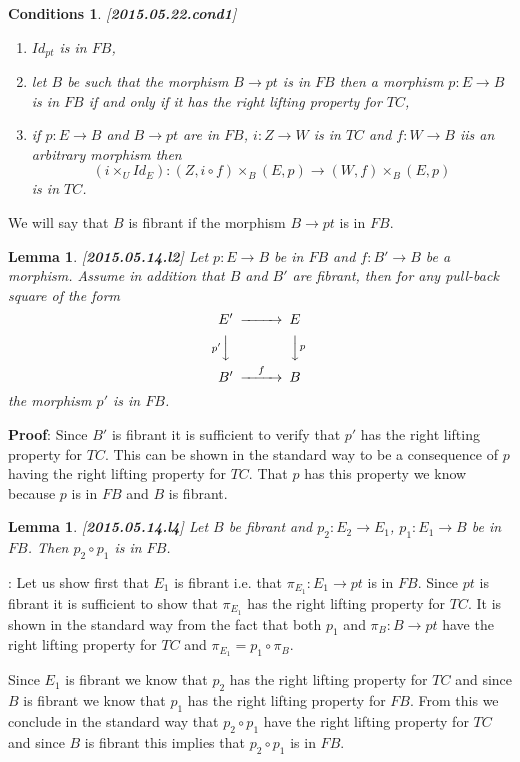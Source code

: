 \documentclass[12pt]{article}
\newenvironment{myproof}{{\bf Proof}:}{\vskip 5mm }
\newtheorem{lemma}[proposition]{Lemma}
\newtheorem{cond}[proposition]{Conditions}
\newcommand{\llabel}[1]{\label{#1}[{\bf #1}]}
\newcommand{\sr}{\rightarrow}
\begin{document}
%
\begin{cond}\llabel{2015.05.22.cond1}
%
\begin{enumerate}
\item $Id_{pt}$ is in $FB$,
\item let $B$ be such that the morphism $B\sr pt$ is in $FB$ then a morphism $p:E\sr B$ is in $FB$ if and only if it has the right lifting property for $TC$,
\item if $p:E\sr B$ and $B\sr pt$ are in $FB$, $i:Z\sr W$ is in $TC$ and $f:W\sr B$ iis an arbitrary morphism then
%
$$(i\times_U Id_E):(Z,i\circ f)\times_B (E,p)\sr (W,f)\times_B (E,p)$$
%
is in $TC$.
%
\end{enumerate}
\end{cond}
%
We will say that $B$ is fibrant if the morphism $B\sr pt$ is in $FB$. 
%
\begin{lemma}
\llabel{2015.05.14.l2}
Let $p:E\sr B$ be in $FB$ and $f:B'\sr B$ be a morphism. Assume in addition that $B$ and $B'$ are fibrant, then for any pull-back square of the form
%
$$
\begin{CD}
E' @>>> E\\
@Vp' VV @VV p V\\
B' @>f>> B
\end{CD}
$$
%
the morphism $p'$ is in $FB$. 
\end{lemma}
%
\begin{myproof}
Since $B'$ is fibrant it is sufficient to verify that $p'$ has the right lifting property for $TC$. This can be shown in the standard way to be a consequence of $p$ having the right lifting property for $TC$. That $p$ has this property we know because $p$ is in $FB$ and $B$ is fibrant.
\end{myproof}
%
\begin{lemma}
\llabel{2015.05.14.l4}
Let $B$ be fibrant and $p_2:E_2\sr E_1$, $p_1:E_1\sr B$ be in $FB$. Then $p_2\circ p_1$ is in $FB$.
\end{lemma}
%
\begin{myproof}
Let us show first that $E_1$ is fibrant i.e. that $\pi_{E_1}:E_1\sr pt$ is in $FB$. Since $pt$ is fibrant it is sufficient to show that $\pi_{E_1}$ has the right lifting property for $TC$. It is shown in the standard way from the fact that both $p_1$ and $\pi_B:B\sr pt$ have the right lifting property for $TC$ and $\pi_{E_1}=p_1\circ \pi_B$. 

Since $E_1$ is fibrant we know that $p_2$ has the right lifting property for $TC$ and since $B$ is fibrant we know that $p_1$ has the right lifting property for $FB$. From this we conclude in the standard way that $p_2\circ p_1$ have the right lifting property for $TC$ and since $B$ is fibrant this implies that $p_2\circ p_1$ is in $FB$.
\end{myproof}
\end{document}
